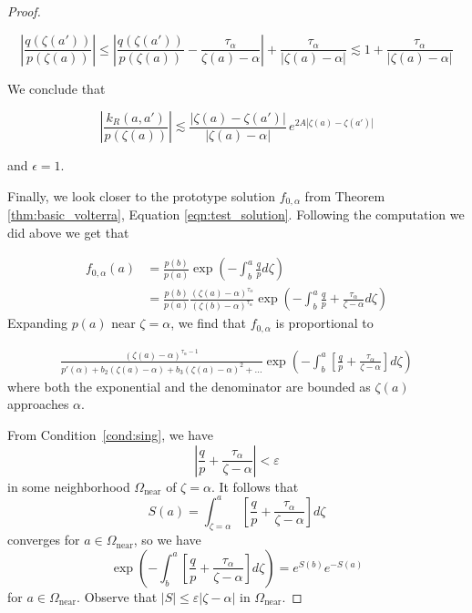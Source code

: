 \documentclass{article}
\theoremstyle{plain}
\newcommand{\domain}{\Omega}
\begin{document}
\begin{proof}
\begin{enumerate}
\[    \left\vert \frac{q(\zeta(a'))}{p(\zeta(a))}\right\vert  \leq \left\vert \frac{q(\zeta(a'))}{p(\zeta(a))} -\frac{\tau_\alpha}{\zeta(a)-\alpha}\right\vert + \frac{\tau_\alpha}{|\zeta(a)-\alpha|}\lesssim 1 +  \frac{\tau_\alpha}{|\zeta(a)-\alpha|} \]

We conclude that 

\[\left\vert \frac{k_R(a,a')}{p(\zeta(a))}\right\vert \lesssim \frac{|\zeta(a)-\zeta(a')|}{|\zeta(a)-\alpha|}\, e^{2A |\zeta(a)-\zeta(a')|}  \]

and $\epsilon=1$.

\end{enumerate}

Finally, we look closer to the prototype solution $f_{0,\alpha}$ from Theorem \ref{thm:basic_volterra}, Equation \eqref{eqn:test_solution}. Following the computation we did above we get that 

\begin{align*}
  f_{0,\alpha}(a)&=\frac{p(b)}{p(a)} \exp\left(-\int_b^a\frac{q}{p} d\zeta\right)\\
  &=\frac{p(b)}{p(a)} \frac{(\zeta(a)-\alpha)^{\tau_\alpha}}{(\zeta(b)-\alpha)^{\tau_\alpha}} \exp\left(-\int_b^a\frac{q}{p}+\frac{\tau_\alpha}{\zeta-\alpha} d\zeta\right)
\end{align*}
Expanding $p(a)$ near $\zeta=\alpha$, we find that $f_{0,\alpha}$ is proportional to  

\begin{align*}
\frac{(\zeta(a)-\alpha)^{\tau_\alpha-1}}{p'(\alpha)+b_2(\zeta(a)-\alpha)+b_3(\zeta(a)-\alpha)^2+...} \exp\left(-\int_b^a\left[\frac{q}{p}+\frac{\tau_\alpha}{\zeta-\alpha}\right] d\zeta\right)
\end{align*}
where both the exponential and the denominator are bounded as $\zeta(a)$ approaches $\alpha$.

\color{DarkTurquoise}
From Condition~\eqref{cond:sing}, we have
\[ \left| \frac{q}{p}+\frac{\tau_\alpha}{\zeta-\alpha} \right| < \varepsilon \]
in some neighborhood $\domain_\text{near}$ of $\zeta = \alpha$. It follows that
\[ S(a) = \int_{\zeta = \alpha}^a \left[\frac{q}{p}+\frac{\tau_\alpha}{\zeta-\alpha}\right] d\zeta \]
converges for $a \in \domain_\text{near}$, so we have
\[ \exp\left(-\int_b^a\left[\frac{q}{p}+\frac{\tau_\alpha}{\zeta-\alpha}\right] d\zeta\right) = e^{S(b)} e^{-S(a)} \]
for $a \in \domain_\text{near}$. Observe that $|S| \le \varepsilon |\zeta - \alpha|$ in $\domain_\text{near}$. 


\end{proof}
\end{document}
